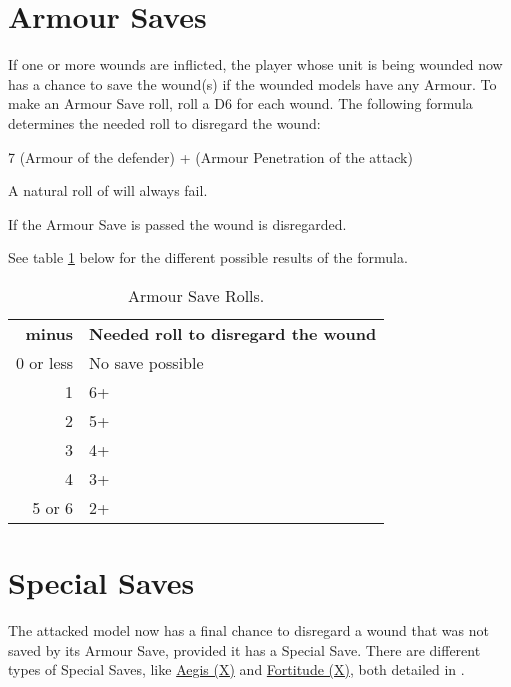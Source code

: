 \section{Armour Saves}
\label{armour_saves}

If one or more wounds are inflicted, the player whose unit is being wounded now has a chance to save the wound(s) if the wounded models have any Armour. To make an Armour Save roll, roll a D6 for each wound. The following formula determines the needed roll to disregard the wound:
\begin{center}
7 \minuss{} (Armour of the defender) + (Armour Penetration of the attack)
\end{center}

A natural roll of  will always fail.

If the Armour Save is passed the wound is disregarded.

See table \ref{table/armour_save_roll} below for the different possible results of the formula.

\begin{table}[!htbp]
\centering
  \begin{tabular}{r l}
  	\hline
    \textbf{\Armour{} minus \AP{}} & \textbf{Needed roll to disregard the wound} \\
    0 or less & No save possible \\
    1 & 6+ \\
    2 & 5+ \\
    3 & 4+ \\
    4 & 3+ \\
    5 or 6 & 2+ \\
    \hline
  \end{tabular}
 \caption{Armour Save Rolls.}
 \label{table/armour_save_roll}
\end{table}

\newpage
\section{Special Saves}
\label{special_saves}

The attacked model now has a final chance to disregard a wound that was not saved by its Armour Save, provided it has a Special Save. There are different types of Special Saves, like \hyperref[aegis]{Aegis (X)} and \hyperref[fortitude]{Fortitude (X)}, both detailed in .

